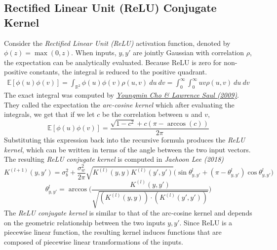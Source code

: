 \documentclass{article}
\newcommand{\R}{\mathbb{R}}
\newcommand{\EX}{\mathbb{E}}
\begin{document}
\subsection{Rectified Linear Unit (ReLU) Conjugate Kernel}
Consider the \textit{Rectified Linear Unit (ReLU)} activation function, denoted by $\phi(z)=\max(0,z)$. When inputs, $y,y'$ are jointly Gaussian with correlation $\rho$, the expectation can be analytically evaluated. Because ReLU is zero for non-positive constants, the integral is reduced to the positive quadrant.
\begin{align}
    \EX[\phi(u)\phi(v)]=\int_{\R^2}\phi(u)\phi(v)\rho(u,v)~du~dv=\int_0^\infty\int_0^\infty uv\rho(u,v)~du~dv
\end{align}
The exact integral was computed by \href{https://papers.nips.cc/paper/2009/hash/5751ec3e9a4feab575962e78e006250d-Abstract.html}{\textit{Youngmin Cho \& Lawrence Saul (2009)}}. They called the expectation the \textit{arc-cosine kernel} which after evaluating the integrals, we get that if we let $c$ be the correlation between $u$ and $v$,
$$\EX[\phi(u)\phi(v)]=\frac{\sqrt{1-c^2}+c(\pi-\arccos(c))}{2\pi}$$
Substituting this expression back into the recursive formula produces the \textit{ReLU kernel}, which can be written in terms of the angle between the two input vectors. The resulting \textit{ReLU conjugate kernel} is computed in \textit{Jaehoon Lee (2018)} 
$$K^{(l+1)}(y,y')=\sigma_b^2+\frac{\sigma_w^2}{2\pi}\sqrt{K^{(l)}(y,y)K^{(l)}(y',y')}\Bigg(\sin\theta^{l}_{y,y'}+(\pi-\theta_{y,y'}^{l})\cos\theta^{l}_{y,y'}\Bigg)$$
$$\theta^l_{y,y'}=\arccos\Bigg(\frac{K^{(l)}(y,y')}{\sqrt{(K^{(l)}(y,y))\cdot (K^{(l)}(y',y'))}}\Bigg)$$
The \textit{ReLU conjugate kernel} is similar to that of the arc-cosine kernel and depends on the geometric relationship between the two inputs $y,y'$. Since ReLU is a piecewise linear function, the resulting kernel induces functions that are composed of piecewise linear transformations of the inputs.
\end{document}
